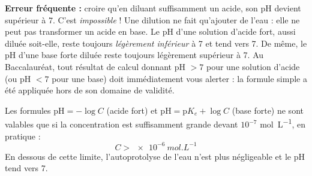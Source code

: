 \documentclass[11pt]{article}
\begin{document}
\begin{attention}
\textbf{Erreur fréquente :} croire qu'en diluant suffisamment un acide, son pH devient supérieur à 7. C'est \emph{impossible} ! Une dilution ne fait qu'ajouter de l'eau : elle ne peut pas transformer un acide en base. Le pH d'une solution d'acide fort, aussi diluée soit-elle, reste toujours \emph{légèrement inférieur} à 7 et tend vers 7. De même, le pH d'une base forte diluée reste toujours légèrement supérieur à 7. Au Baccalauréat, tout résultat de calcul donnant pH $> 7$ pour une solution d'acide (ou pH $< 7$ pour une base) doit immédiatement vous alerter : la formule simple a été appliquée hors de son domaine de validité.
\end{attention}

\begin{aretenir}
Les formules $\mathrm{pH} = -\log C$ (acide fort) et $\mathrm{pH} = \mathrm{p}K_e + \log C$ (base forte) ne sont valables que si la concentration est suffisamment grande devant $10^{-7}$ \si{mol.L^{-1}}, en pratique :
\[ C > \SI{e-6}{mol.L^{-1}} \]
En dessous de cette limite, l'autoprotolyse de l'eau n'est plus négligeable et le pH tend vers 7.
\end{aretenir}
\end{document}
